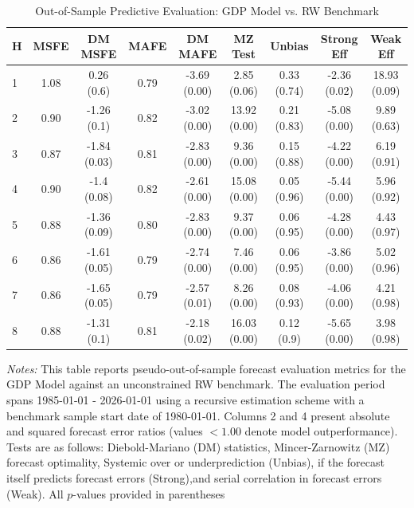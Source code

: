 \begin{table}[htbp]
\centering
\caption{Out-of-Sample Predictive Evaluation: GDP Model vs. RW Benchmark}
\label{tab:gdp_model_evaluation}
\footnotesize
\begin{tabular}{l cccccccc}
\hline\hline
\rule{0pt}{3ex}
\textbf{H} & \textbf{MSFE} & \textbf{DM MSFE} & \textbf{MAFE} & \textbf{DM MAFE} & \textbf{MZ Test} & \textbf{Unbias} & \textbf{Strong Eff} & \textbf{Weak Eff} \\[0.5ex]
\hline
\rule{0pt}{2.5ex}
1 & 1.08 & 0.26 (0.6) & 0.79 & -3.69 (0.00) & 2.85 (0.06) & 0.33 (0.74) & -2.36 (0.02) & 18.93 (0.09) \\
2 & 0.90 & -1.26 (0.1) & 0.82 & -3.02 (0.00) & 13.92 (0.00) & 0.21 (0.83) & -5.08 (0.00) & 9.89 (0.63) \\
3 & 0.87 & -1.84 (0.03) & 0.81 & -2.83 (0.00) & 9.36 (0.00) & 0.15 (0.88) & -4.22 (0.00) & 6.19 (0.91) \\
4 & 0.90 & -1.4 (0.08) & 0.82 & -2.61 (0.00) & 15.08 (0.00) & 0.05 (0.96) & -5.44 (0.00) & 5.96 (0.92) \\
5 & 0.88 & -1.36 (0.09) & 0.80 & -2.83 (0.00) & 9.37 (0.00) & 0.06 (0.95) & -4.28 (0.00) & 4.43 (0.97) \\
6 & 0.86 & -1.61 (0.05) & 0.79 & -2.74 (0.00) & 7.46 (0.00) & 0.06 (0.95) & -3.86 (0.00) & 5.02 (0.96) \\
7 & 0.86 & -1.65 (0.05) & 0.79 & -2.57 (0.01) & 8.26 (0.00) & 0.08 (0.93) & -4.06 (0.00) & 4.21 (0.98) \\
8 & 0.88 & -1.31 (0.1) & 0.81 & -2.18 (0.02) & 16.03 (0.00) & 0.12 (0.9) & -5.65 (0.00) & 3.98 (0.98) \\
\hline\hline
\end{tabular}%
\par\smallskip
\parbox{\textwidth}{\scriptsize \textit{Notes:} This table reports pseudo-out-of-sample forecast evaluation metrics for the GDP Model against an unconstrained RW benchmark. The evaluation period spans 1985-01-01 - 2026-01-01 using a recursive estimation scheme with a benchmark sample start date of 1980-01-01. Columns 2 and 4 present absolute and squared forecast error ratios (values $< 1.00$ denote model outperformance). Tests are as follows: Diebold-Mariano (DM) statistics, Mincer-Zarnowitz (MZ) forecast optimality, Systemic over or underprediction (Unbias), if the forecast itself predicts forecast errors (Strong),and serial correlation in forecast errors (Weak). All $p$-values provided in parentheses}
\end{table}
